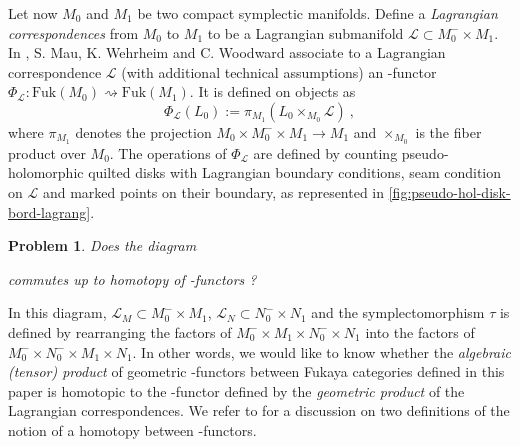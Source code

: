 \documentclass[twoside, 11pt]{amsart}
\newtheorem{problem}{Problem}
\theoremstyle{remark}
\begin{document}
Let now $M_0$ and $M_1$ be two compact symplectic manifolds. Define a \emph{Lagrangian correspondences} from $M_0$ to $M_1$ to be a Lagrangian submanifold $\mathcal{L} \subset M_0^{-} \times M_1$.
In \cite{mau-wehrheim-woodward}, S. Mau, K. Wehrheim and C. Woodward associate to a Lagrangian correspondence $\mathcal{L}$ (with additional technical assumptions) an \Ainf -functor $\Phi_{\mathcal{L}} : \mathrm{Fuk}(M_0) \rightsquigarrow \mathrm{Fuk}(M_1)$.  
It is defined on objects as 
\[ \Phi_{\mathcal{L}} (L_0) := \pi_{M_1} ( L_0 \times_{M_0} \mathcal{L} ) \ , \]
where $\pi_{M_1}$ denotes the projection $M_0 \times M_0^{-} \times M_1 \rightarrow M_1$ and $\times_{M_0}$ is the fiber product over $M_0$. The operations of $\Phi_{\mathcal{L}}$ are defined by counting pseudo-holomorphic quilted disks with Lagrangian boundary conditions, seam condition on $\mathcal{L}$ and marked points on their boundary, as represented in \cref{fig:pseudo-hol-disk-bord-lagrang}. 

\begin{problem} \label{problem}
Does the diagram
\begin{center} 
\end{center}
commutes up to homotopy of \Ainf -functors ? 
\end{problem}

In this diagram, $\mathcal{L}_M \subset M_0^{-} \times M_1$, $\mathcal{L}_N \subset N_0^- \times N_1$ and the symplectomorphism $\tau$ is defined by rearranging the factors of $M_0^{-} \times M_1 \times N_0^- \times N_1$ into the factors of $M_0^{-} \times N_0^- \times M_1 \times N_1$. In other words, we would like to know whether the \emph{algebraic (tensor) product} of geometric \Ainf -functors between Fukaya categories defined in this paper is homotopic to the \Ainf -functor defined by the \emph{geometric product} of the Lagrangian correspondences. 
We refer to \cite[Section 13]{fukaya-unobstructed} for a discussion on two definitions of the notion of a homotopy between \Ainf -functors.

\newpage
\end{document}
